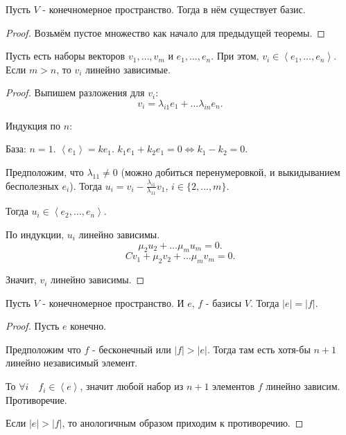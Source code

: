 \begin{consequence} \thmslashn

    Пусть $V$ - конечномерное пространство. Тогда в нём существует базис.
    \begin{proof}
        Возьмём пустое множество как начало для предыдущей теоремы.
    \end{proof}
\end{consequence}
\begin{lemma} \thmslashn

   Пусть есть наборы векторов $v_1, \ldots, v_{m}$ и $e_1, \ldots, e_{n}$. При этом, $v_{i}\in \left<e_1, \ldots, e_{n}\right>$. Если $m > n$, то $v_{i}$ линейно зависимые.
    \begin{proof} \thmslashn
    
        Выпишем разложения для $v_{i}$:
        \[ v_{i} = \lambda_{i 1}e_1 + \ldots \lambda_{in}e_{n} .\]

        Индукция по $n$:

        База: $n=1$. $\left<e_{1}\right> = ke_1$. $k_1e_1 + k_2e_1 = 0 \iff k_1-k_2 = 0$.

        Предположим, что $\lambda_{11} \neq 0$ (можно добиться перенумеровкой, и выкидыванием бесполезных $e_{i}$).
        Тогда $u_{i} = v_{i} - \frac{\lambda_{i 1}}{\lambda_{11}}v_1$, $i\in \{2, \ldots, m\} $.

        Тогда $u_{i}\in \left<e_2, \ldots, e_{n}\right>$.

        По индукции, $u_{i}$ линейно зависимы.
        \[ \mu_2u_2 + \ldots \mu_{m}u_{m} = 0 .\]
        \[ Cv_1 + \mu_2v_2 + \ldots \mu_{m}v_{m} = 0 .\]

        Значит, $v_{i}$ линейно зависимы.
    \end{proof}
\end{lemma}
\begin{theorem} \thmslashn

    Пусть $V$ - конечномерное пространство. И $e$, $f$ - базисы $V$. Тогда $|e| = |f|$.
    \begin{proof}
        Пусть $e$ конечно.

        Предположим что $f$ - бесконечный или $|f| > |e|$. Тогда там есть хотя-бы $n+1$ линейно независимый элемент.

        То $\forall{i}\quad f_{i}\in \left<e\right>$, значит любой набор из $n+1$ элементов $f$ линейно зависим. Противоречие.

        Если $|e| > |f|$, то анологичным образом приходим к противоречию.
    \end{proof}
\end{theorem}
